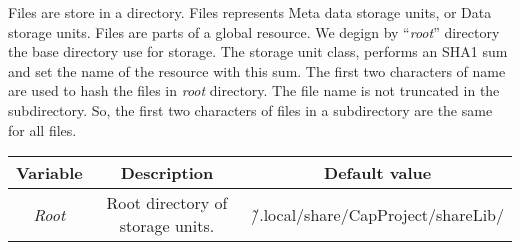 Files are store in a directory.
Files represents Meta data storage units, or Data storage units.
Files are parts of a global resource.
We degign by “\emph{root}” directory the base directory use for storage.
The storage unit class, performs an SHA1 sum and set the name of the resource with this sum.
The first two characters of name are used to hash the files in \emph{root} directory.
The file name is not truncated in the subdirectory.
So, the first two characters of files in a subdirectory are the same for all files.


\begin{tabular}{|c|c|c|}
 \hline
 {Variable} & {Description} & {Default value} \\
 \hline
 \emph{Root} & Root directory of storage units. & \~/.local/share/CapProject/shareLib/ \\
 \hline
\end{tabular}
